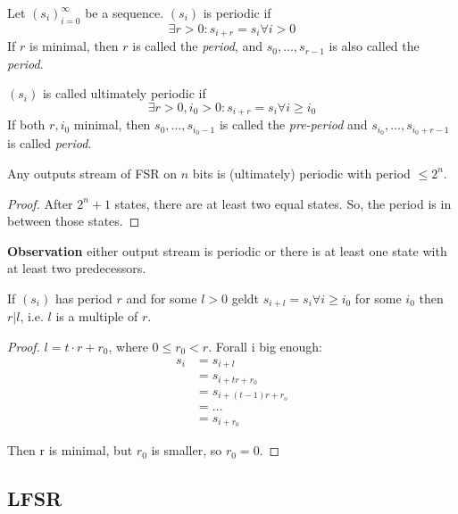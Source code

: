 \documentclass[language=english,number=]{homework}
\begin{document}
    \begin{definition}[Periodic]
        Let $(s_i)_{i=0}^{\infty}$ be a sequence.
        $(s_i)$ is periodic if
        \[
            \exists r > 0 : s_{i+r} = s_i \forall i > 0
        \]
        If $r$ is minimal, then $r$ is called the \textit{period}, and $s_0, \dots, s_{r-1}$ is also called the \textit{period}.
    \end{definition}

    \begin{definition}
        $(s_i)$ is called ultimately periodic if
        \[
            \exists r > 0, i_0 > 0 : s_{i+r} = s_{i} \forall i \ge i_0
        \]
        If both $r, i_0$ minimal, then $s_0, \dots, s_{i_0 - 1}$ is called the \textit{pre-period} and $s_{i_0}, \dots, s_{i_0 + r-1}$ is called \textit{period}.
    \end{definition}

    \begin{theorem}
        Any outputs stream of FSR on $n$ bits is (ultimately) periodic with period $\le 2^n$.
    \end{theorem}
    \begin{proof}
        After $2^{n}+1$ states, there are at least two equal states.
        So, the period is in between those states.
    \end{proof}

    \textbf{Observation} either output stream is periodic or there is at least one state with at least two predecessors.

    \begin{theorem}
        If $(s_i)$ has period $r$ and for some $l > 0$ geldt $s_{i+l} = s_i \forall i \ge i_0$ for some $i_0$ then $r | l$, i.e. $l$ is a multiple of $r$.
    \end{theorem}
    \begin{proof}
        $l = t \cdot r + r_0$, where $0 \le r_0 < r$.
        Forall i big enough:
        \begin{align*}
            s_i &= s_{i+l} \\
            &= s_{i+tr + r_0} \\
            &= s_{i + (t-1)r + r_o} \\
            &= \dots \\
            &= s_{i+r_0}
        \end{align*}

        Then r is minimal, but $r_0$ is smaller, so $r_0 = 0$.
    \end{proof}

    \subsection{LFSR}
\end{document}
